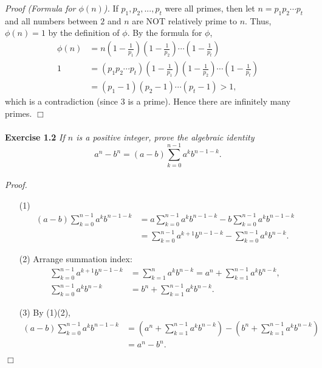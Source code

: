 \documentclass{article}
\begin{document}
\emph{Proof (Formula for $\phi(n)$).}
If
$p_1, p_2, ..., p_t$ were all primes, then let
$n = p_1 p_2 \cdots p_t$ and all numbers between $2$ and $n$ are
NOT relatively prime to $n$.
Thus, $\phi(n) = 1$ by the definition of $\phi$.
By the formula for $\phi$,
\begin{align*}
\phi(n)
&= n
\left( 1 - \frac{1}{p_1} \right)
\left( 1 - \frac{1}{p_2} \right)
\cdots
\left( 1 - \frac{1}{p_t} \right) \\
1
&= (p_1 p_2 \cdots p_t)
\left( 1 - \frac{1}{p_1} \right)
\left( 1 - \frac{1}{p_2} \right)
\cdots
\left( 1 - \frac{1}{p_t} \right) \\
&= (p_1 - 1)(p_2 - 1) \cdots (p_t - 1) > 1,
\end{align*}
which is a contradiction (since $3$ is a prime).
Hence there are infinitely many primes.
$\Box$ \\\\


\textbf{Exercise 1.2}
\emph{If $n$ is a positive integer, prove the algebraic identity
$$a^n - b^n = (a - b) \sum_{k=0}^{n-1} a^k b^{n-1-k}.$$} \\

\emph{Proof.}
\begin{enumerate}
\item[(1)]
\begin{align*}
(a - b) \sum_{k=0}^{n-1} a^k b^{n-1-k}
&= a \sum_{k=0}^{n-1} a^k b^{n-1-k} - b \sum_{k=0}^{n-1} a^k b^{n-1-k} \\
&= \sum_{k=0}^{n-1} a^{k+1} b^{n-1-k} - \sum_{k=0}^{n-1} a^k b^{n-k}.
\end{align*}
\item[(2)] Arrange summation index:
\begin{align*}
\sum_{k=0}^{n-1} a^{k+1} b^{n-1-k}
&= \sum_{k=1}^{n} a^{k} b^{n-k}
= a^n + \sum_{k=1}^{n-1} a^{k} b^{n-k}, \\
\sum_{k=0}^{n-1} a^k b^{n-k}
&= b^n + \sum_{k=1}^{n-1} a^{k} b^{n-k}.
\end{align*}
\item[(3)]
By (1)(2),
\begin{align*}
(a - b) \sum_{k=0}^{n-1} a^k b^{n-1-k}
&= \left( a^n + \sum_{k=1}^{n-1} a^{k} b^{n-k} \right)
- \left( b^n + \sum_{k=1}^{n-1} a^{k} b^{n-k} \right) \\
&= a^n - b^n.
\end{align*}
\end{enumerate}
$\Box$ \\
\end{document}
